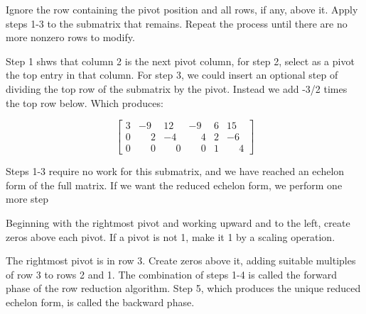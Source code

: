 \documentclass{article}
\begin{document}
\begin{tcolorbox}[colback=green!20!white,colframe=green!80!black,title=Step 4]
    Ignore the row containing the pivot position and all rows, if any, above it. Apply steps 1-3 to the submatrix that remains. Repeat the process until there are no more nonzero rows to modify.
\end{tcolorbox}

Step 1 shws that column 2 is the next pivot column, for step 2, select as a pivot the top entry in that column. \newline For step 3, we could insert an optional step of dividing the top row of the submatrix by the pivot. Instead we add -3/2 times the top row below. Which produces:

\begin{equation*}
    \begin{bmatrix}
        3&-9&12&-9&6&15\\
        0&\phantom{-}2&-4&\phantom{-}4&2&-6\\
        0&\phantom{+}0&\phantom{-}0&\phantom{-}0&1&\phantom{-}4
    \end{bmatrix}
\end{equation*}

Steps 1-3 require no work for this submatrix, and we have reached an echelon form of the full matrix. If we want the reduced echelon form, we perform one more step

\begin{tcolorbox}[colback=green!20!white,colframe=green!80!black,title=Step 5]
    Beginning with the rightmost pivot and working upward and to the left, create zeros above each pivot. If a pivot is not 1, make it 1 by a scaling operation.
\end{tcolorbox}

The rightmost pivot is in row 3. Create zeros above it, adding suitable multiples of row 3 to rows 2 and 1. \newline The combination of steps 1-4 is called the forward phase of the row reduction algorithm. Step 5, which produces the unique reduced echelon form, is called the backward phase.
\end{document}
